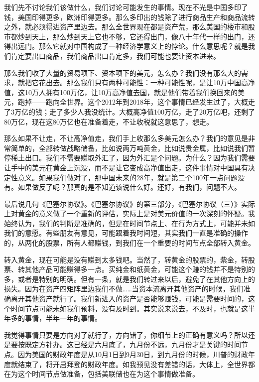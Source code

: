 \documentclass[UTF8, 12pt, a4paper]{ctexrep}
\begin{document}
我们先不讨论我们该做什么，我们讨论可能发生的事情。现在不光是中国多印了钱，美国印得更多，欧洲印得更多。那么多印出的钱除了进行商品生产和商品流转之外，就必须得进资产里边去。那么全世界现在都是资产荒，那么美国的楼市和股市都炒到天上，那么炒到天上它也不够，它还得出门，像八十年代一样的出门，还得出远门。那么它就对中国构成了一种经济学意义上的悖论。什么意思呢？就是我们肯定要出口商品，我们商品出口肯定多，我们可能也要让资本进来。

那么我们收了大量的贸易项下、资本项下的美元，怎么办？我们没有那么大的需求，就把它花出去。那么我们只有两种可能性：一种可能性呢，是让10万中国高净值，这10万人拥有100万亿，让10万高净值去国，就是他们带着我们换回来的美元，跑掉——跑向全世界。这个2012年到2018年，这个事情已经发生过了，大概走了3万亿的钱；走了多少人我没统计。大概高净值100万亿，走了20万亿吧，还剩了80万亿，现在这80万亿也在准备着走，不让收税就这意思了，想走。

那么如果不让走，不让高净值走，我们手上收那么多美元怎么办？我们的意见是非常简单的，全部转做战略储备，比如说两万吨黄金，比如说贵金属，比如说我们暂停稀土出口。我们不需要赚取外汇了，因为外汇是个问题。为什么？因为我们需要让手中的美元在黄金上沉没，而不是让它变成高净值出走，这件事情对中国具有决定性意义。如果我们做对了，那中国未来的28年，就是第二个100年一点问题没有。如果做反了呢？那真的是不知道该说什么好。还好，有我们，问题不大。

最后说几句《巴塞尔协议》。《巴塞尔协议》的第三部分，《巴塞尔协议（三）》实际上对黄金的意义做了一个重新的评估，实际上是对美元价值的一次深刻的怀疑。我始终认为，我们的判断是准确的，但是在时间节点上、在行为方式上，可能并未如我们的意愿。有些朋友有意见，可能跟着我时间短，其实我们一直是准确的操作的，从两化的股票，所有人都赚钱，到我们在一个重要的时间节点全部转入黄金。

转入黄金，现在可能是没有赚到太多钱吧。当然了，转黄金的股票的，紫金，转股票、转其他产品可能赚得多一点。买纯金和纸黄金，可能这个赚的钱并不是特别的多，或者是特别的明确。但有一条，就是我们转过来以后，避免了在其他方向上的损失。因为在资产四矩阵里边我们不做……当资本流离开其他资产的时候，我们准确离开其他资产就行了。我们新进入的资产是否能够赚钱，可能是需要时间的，这个时间节点可能未如我们预料，没有及时到。其实说来说去，不及时，也就是这半年多的事情，半年一年的事情。

我觉得事情只要是方向对了就行了，方向错了，你细节上的正确有意义吗？所以还是要按既定方针办。这已经是六月底了，九月份不远，九月份才是关键的时间节点。因为美国的财政年度是从10月1日到9月30日，到九月份的时候，川普的财政年度就结束了，将开启拜登的财政年度。如我预见没有差错的话，大体上，全世界都在为这个时间节点做准备，包括美联储也在为这个事情做准备。
\end{document}
